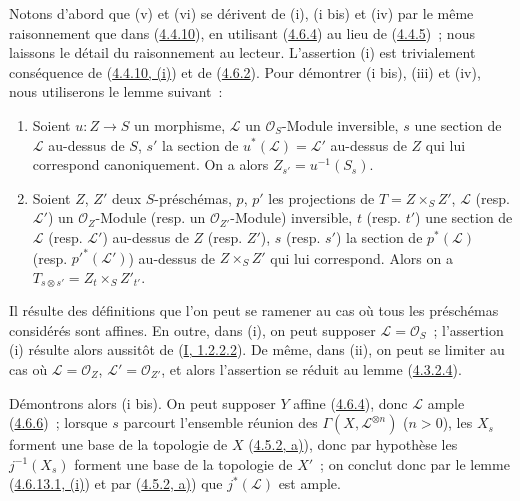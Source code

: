 Notons d'abord que (v) et (vi) se dérivent de (i), (i bis) et (iv) par le
même raisonnement que dans (\hyperref[II.4.4.10-fr]{4.4.10}), en utilisant
(\hyperref[II.4.6.4-fr]{4.6.4}) au lieu de
(\hyperref[II.4.4.5-fr]{4.4.5})~; nous laissons le détail du raisonnement au
lecteur. L'assertion (i) est trivialement conséquence de
(\hyperref[II.4.4.10-fr]{4.4.10, (i)}) et de
(\hyperref[II.4.6.2-fr]{4.6.2}). Pour démontrer (i bis), (iii) et (iv), nous
utiliserons le lemme suivant~:

\begin{lemma}[4.6.13.1]
\label{II.4.6.13.1-fr}
\begin{enumerate}
  \item[\rm{(i)}] Soient $u:Z\to S$ un morphisme, $\mathcal{L}$ un
  $\mathcal{O}_S$-Module inversible, $s$ une section de $\mathcal{L}$
  au-dessus de $S$, $s'$ la section de $u^*(\mathcal{L})=\mathcal{L}'$
  au-dessus de $Z$ qui lui correspond canoniquement. On a alors
  $Z_{s'}=u^{-1}(S_s)$.
  \item[\rm{(ii)}] Soient $Z$, $Z'$ deux $S$-préschémas, $p$, $p'$ les
  projections de $T=Z\times_S Z'$, $\mathcal{L}$ (resp.
  $\mathcal{L}'$) un $\mathcal{O}_Z$-Module (resp. un
  $\mathcal{O}_{Z'}$-Module) inversible, $t$ (resp. $t'$) une section de
  $\mathcal{L}$ (resp. $\mathcal{L}'$) au-dessus de $Z$ (resp. $Z'$), $s$
  (resp. $s'$) la section de $p^*(\mathcal{L})$ (resp.
  $p'^*(\mathcal{L}')$) au-dessus de $Z\times_S Z'$ qui lui correspond.
  Alors on a $T_{s\otimes s'}=Z_t\times_S Z'_{t'}$.
\end{enumerate}
\end{lemma}

Il résulte des définitions que l'on peut se ramener au cas où tous les
préschémas considérés sont affines. En outre, dans (i), on peut supposer
$\mathcal{L}=\mathcal{O}_S$~; l'assertion (i) résulte alors aussitôt de
(\hyperref[I.1.2.2.2-fr]{I, 1.2.2.2}). De même, dans (ii), on peut se
limiter au cas où $\mathcal{L}=\mathcal{O}_Z$,
$\mathcal{L}'=\mathcal{O}_{Z'}$, et alors l'assertion se réduit au lemme
(\hyperref[II.4.3.2.4-fr]{4.3.2.4}).

Démontrons alors (i bis). On peut supposer $Y$ affine
(\hyperref[II.4.6.4-fr]{4.6.4}), donc $\mathcal{L}$ ample
(\hyperref[II.4.6.6-fr]{4.6.6})~; lorsque $s$ parcourt l'ensemble réunion
des $\Gamma(X,\mathcal{L}^{\otimes n})$ ($n>0$), les $X_s$ forment une
base de la topologie de $X$ (\hyperref[II.4.5.2-fr]{4.5.2, a)}), donc par
hypothèse les $j^{-1}(X_s)$ forment une base de la topologie de $X'$~; on
conclut donc par le lemme
(\hyperref[II.4.6.13.1-fr]{4.6.13.1, (i)}) et par
(\hyperref[II.4.5.2-fr]{4.5.2, a)}) que $j^*(\mathcal{L})$ est ample.

